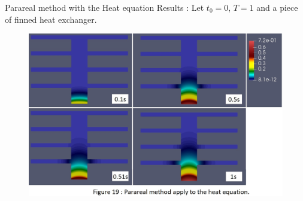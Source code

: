 \begin{frame}[allowframebreaks]{Parareal method with the Heat equation}
	Results : Let $t_0=0$, $T=1$ and a piece of finned heat exchanger.
	\begin{figure}[H]
		\centering
		\includegraphics[width=0.7\linewidth]{"images/parareal/heat_results.jpg"}
	\end{figure}
\end{frame}





